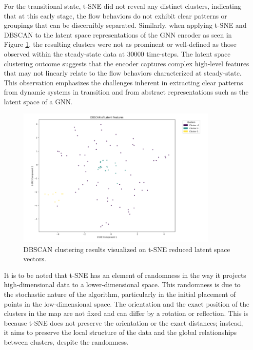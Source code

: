 For the transitional state, t-SNE did not reveal any distinct clusters, indicating that at this early stage, the flow behaviors do not exhibit clear patterns or groupings that can be discernibly separated. Similarly, when applying t-SNE and DBSCAN to the latent space representations of the GNN encoder as seen in Figure \ref{fig:dbscan_results2}, the resulting clusters were not as prominent or well-defined as those observed within the steady-state data at 30000 time-steps. The latent space clustering outcome suggests that the encoder captures complex high-level features that may not linearly relate to the flow behaviors characterized at steady-state. This observation emphasizes the challenges inherent in extracting clear patterns from dynamic systems in transition and from abstract representations such as the latent space of a GNN.
\begin{figure}[ht]
    \centering
    \includegraphics[width=10cm]{images/Clustering/cluster2.png}
    \caption{DBSCAN clustering results visualized on t-SNE reduced latent space vectors.}
    \label{fig:dbscan_results2}
    \end{figure}

It is to be noted that t-SNE has an element of randomness in the way it projects high-dimensional data to a lower-dimensional space. This randomness is due to the stochastic nature of the algorithm, particularly in the initial placement of points in the low-dimensional space. The orientation and the exact position of the clusters in the map are not fixed and can differ by a rotation or reflection. This is because t-SNE does not preserve the orientation or the exact distances; instead, it aims to preserve the local structure of the data and the global relationships between clusters, despite the randomness. 